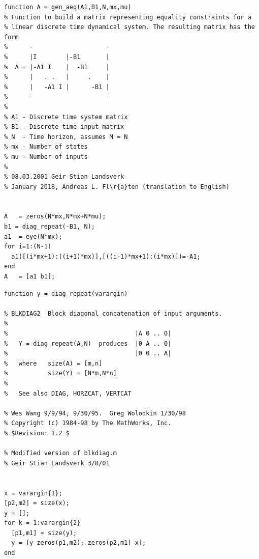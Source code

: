 \begin{lstlisting}[caption={gen\_aeq.m}, label={lst:gen_aeq}]
function A = gen_aeq(A1,B1,N,mx,mu)
% Function to build a matrix representing equality constraints for a 
% linear discrete time dynamical system. The resulting matrix has the form                            
%      -                    -                                   
%      |I        |-B1       |                                   
%  A = |-A1 I    |  -B1     |                                   
%      |   . .   |     .    |                                   
%      |   -A1 I |      -B1 |                                   
%      -                    -                                   
%                                                               
% A1 - Discrete time system matrix                          
% B1 - Discrete time input matrix                       
% N  - Time horizon, assumes M = N
% mx - Number of states                               
% mu - Number of inputs                                     
%                                                               
% 08.03.2001 Geir Stian Landsverk
% January 2018, Andreas L. Fl\r{a}ten (translation to English)
                                                              

A 	= zeros(N*mx,N*mx+N*mu);
b1 = diag_repeat(-B1, N);
a1	= eye(N*mx);
for i=1:(N-1)
  a1([(i*mx+1):((i+1)*mx)],[((i-1)*mx+1):(i*mx)])=-A1;
end
A	= [a1 b1];
\end{lstlisting}

\begin{lstlisting}[caption={diag\_repeat.m}, label={lst:diag_repeat}]
function y = diag_repeat(varargin)

% BLKDIAG2  Block diagonal concatenation of input arguments.
%
%                                   |A 0 .. 0|
%   Y = diag_repeat(A,N)  produces  |0 A .. 0|
%                                   |0 0 .. A|
%   where 	size(A) = [m,n]
%			size(Y) = [N*m,N*n]
%
%   See also DIAG, HORZCAT, VERTCAT

% Wes Wang 9/9/94, 9/30/95.  Greg Wolodkin 1/30/98
% Copyright (c) 1984-98 by The MathWorks, Inc.
% $Revision: 1.2 $

% Modified version of blkdiag.m
% Geir Stian Landsverk 3/8/01


x = varargin{1};
[p2,m2] = size(x);
y = [];
for k = 1:varargin{2}
  [p1,m1] = size(y); 
  y = [y zeros(p1,m2); zeros(p2,m1) x];
end
\end{lstlisting}



